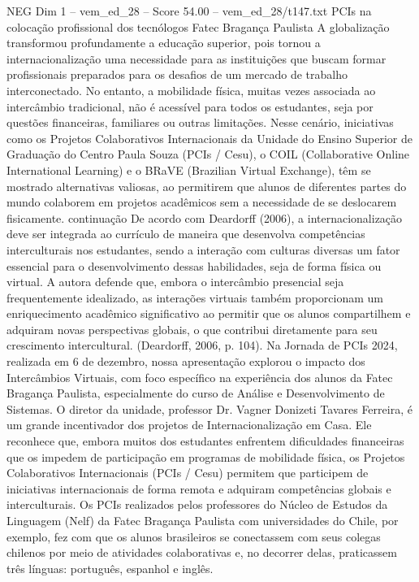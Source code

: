 \begin{textsample}{NEG Dim 1 – vem\_ed\_28 – Score 54.00 – vem\_ed\_28/t147.txt}  \label{ex:f1_neg_186}
PCIs na colocação profissional dos tecnólogos Fatec Bragança Paulista A globalização transformou profundamente a educação superior, pois tornou a internacionalização uma necessidade para as instituições que buscam formar profissionais preparados para os desafios de um mercado de trabalho interconectado.
No entanto, a mobilidade física, muitas vezes associada ao intercâmbio tradicional, não é acessível para todos os estudantes, seja por questões financeiras, familiares ou outras limitações.
Nesse cenário, iniciativas como os Projetos Colaborativos Internacionais da Unidade do Ensino Superior de Graduação do Centro Paula Souza (PCIs / Cesu), o COIL (Collaborative Online International Learning) e o BRaVE (Brazilian Virtual Exchange), têm se mostrado alternativas valiosas, ao permitirem que alunos de diferentes partes do mundo colaborem em projetos acadêmicos sem a necessidade de se deslocarem fisicamente. continuação De acordo com Deardorff (2006), a internacionalização deve ser integrada ao currículo de maneira que desenvolva competências interculturais nos estudantes, sendo a interação com culturas diversas um fator essencial para o desenvolvimento dessas habilidades, seja de forma física ou virtual.
A autora defende que, embora o intercâmbio presencial seja frequentemente idealizado, as interações virtuais também proporcionam um enriquecimento acadêmico significativo ao permitir que os alunos compartilhem e adquiram novas perspectivas globais, o que contribui diretamente para seu crescimento intercultural. (Deardorff, 2006, p. 104).
Na Jornada de PCIs 2024, realizada em 6 de dezembro, nossa apresentação explorou o impacto dos Intercâmbios Virtuais, com foco específico na experiência dos alunos da Fatec Bragança Paulista, especialmente do curso de Análise e Desenvolvimento de Sistemas.
O diretor da unidade, professor Dr.
Vagner Donizeti Tavares Ferreira, é um grande incentivador dos projetos de Internacionalização em Casa.
Ele reconhece que, embora muitos dos estudantes enfrentem dificuldades financeiras que os impedem de participação em programas de mobilidade física, os Projetos Colaborativos Internacionais (PCIs / Cesu) permitem que participem de iniciativas internacionais de forma remota e adquiram competências globais e interculturais.
Os PCIs realizados pelos professores do Núcleo de Estudos da Linguagem (Nelf) da Fatec Bragança Paulista com universidades do Chile, por exemplo, fez com que os alunos brasileiros se conectassem com seus colegas chilenos por meio de atividades colaborativas e, no decorrer delas, praticassem três línguas: português, espanhol e inglês.

\end{textsample}
